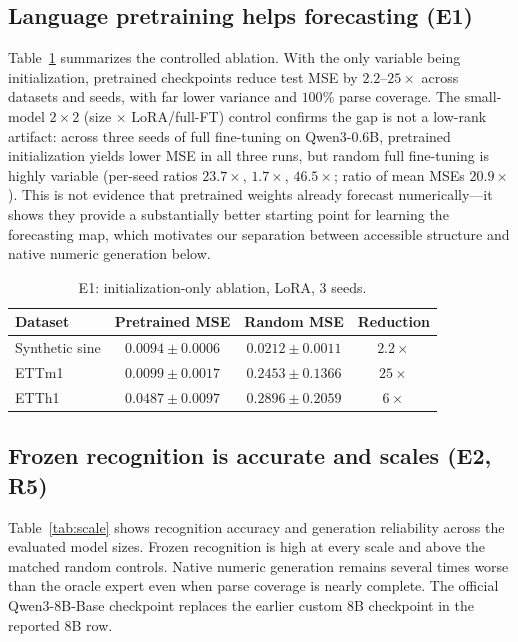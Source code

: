 \documentclass{article}
\begin{document}
\subsection{Language pretraining helps forecasting (E1)}
Table~\ref{tab:e1} summarizes the controlled ablation.  With the only variable
being initialization, pretrained checkpoints reduce test MSE by $2.2$--$25\times$
across datasets and seeds, with far lower variance and $100\%$ parse coverage.
The small-model $2\times2$ (size $\times$ LoRA/full-FT) control confirms the
gap is not a low-rank artifact: across three seeds of full fine-tuning on
Qwen3-0.6B, pretrained initialization yields lower MSE in all three runs, but
random full fine-tuning is highly variable (per-seed ratios $23.7\times$,
$1.7\times$, $46.5\times$; ratio of mean MSEs $20.9\times$).  This is not
evidence that pretrained weights already forecast numerically---it shows they
provide a substantially better starting point for learning the forecasting
map, which motivates our separation between accessible structure and native
numeric generation below.

\begin{table}[t]
\centering
\small
\begin{tabular}{lccc}
\toprule
Dataset & Pretrained MSE & Random MSE & Reduction \\
\midrule
Synthetic sine & $0.0094\pm0.0006$ & $0.0212\pm0.0011$ & $2.2\times$ \\
ETTm1 & $0.0099\pm0.0017$ & $0.2453\pm0.1366$ & $25\times$ \\
ETTh1 & $0.0487\pm0.0097$ & $0.2896\pm0.2059$ & $6\times$ \\
\bottomrule
\end{tabular}
\caption{E1: initialization-only ablation, LoRA, 3 seeds.}
\label{tab:e1}
\end{table}

\subsection{Frozen recognition is accurate and scales (E2, R5)}
Table~\ref{tab:scale} shows recognition accuracy and generation reliability
across the evaluated model sizes.  Frozen recognition is high at every scale
and above the matched random controls.  Native numeric generation remains
several times worse than the oracle expert even when parse coverage is nearly
complete.  The official Qwen3-8B-Base checkpoint replaces the earlier custom
8B checkpoint in the reported 8B row.
\end{document}
